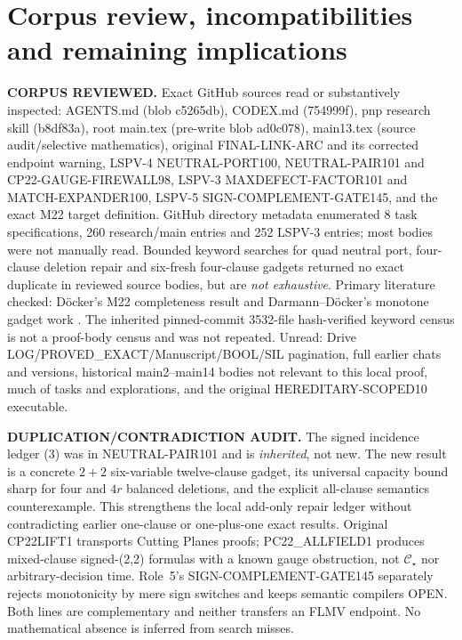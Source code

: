 \documentclass[11pt]{article}
\newcommand{\CS}{\mathcal C_\star}
\begin{document}
\section{Corpus review, incompatibilities and remaining implications}
\noindent\textbf{CORPUS REVIEWED.} Exact GitHub sources read or substantively inspected: AGENTS.md (blob c5265db), CODEX.md (754999f), pnp research skill (b8df83a), root main.tex (pre-write blob ad0c078), main13.tex (source audit/selective mathematics), original FINAL-LINK-ARC and its corrected endpoint warning, LSPV-4 NEUTRAL-PORT100, NEUTRAL-PAIR101 and CP22-GAUGE-FIREWALL98, LSPV-3 MAXDEFECT-FACTOR101 and MATCH-EXPANDER100, LSPV-5 SIGN-COMPLEMENT-GATE145, and the exact M22 target definition. GitHub directory metadata enumerated 8 task specifications, 260 research/main entries and 252 LSPV-3 entries; most bodies were not manually read. Bounded keyword searches for quad neutral port, four-clause deletion repair and six-fresh four-clause gadgets returned no exact duplicate in reviewed source bodies, but are \emph{not exhaustive}. Primary literature checked: D\"ocker's M22 completeness result \cite{docker} and Darmann--D\"ocker's monotone gadget work \cite{darmann}. The inherited pinned-commit 3532-file hash-verified keyword census is not a proof-body census and was not repeated. Unread: Drive LOG/PROVED_EXACT/Manuscript/BOOL/SIL pagination, full earlier chats and versions, historical main2--main14 bodies not relevant to this local proof, much of tasks and explorations, and the original HEREDITARY-SCOPED10 executable.

\noindent\textbf{DUPLICATION/CONTRADICTION AUDIT.} The signed incidence ledger (3) was in NEUTRAL-PAIR101 and is \emph{inherited}, not new. The new result is a concrete \(2+2\) six-variable twelve-clause gadget, its universal capacity bound sharp for four and \(4r\) balanced deletions, and the explicit all-clause semantics counterexample. This strengthens the local add-only repair ledger without contradicting earlier one-clause or one-plus-one exact results. Original CP22LIFT1 transports Cutting Planes proofs; PC22_ALLFIELD1 produces mixed-clause signed-(2,2) formulas with a known gauge obstruction, not \(\CS\) nor arbitrary-decision time. Role~5's SIGN-COMPLEMENT-GATE145 separately rejects monotonicity by mere sign switches and keeps semantic compilers OPEN. Both lines are complementary and neither transfers an FLMV endpoint. No mathematical absence is inferred from search misses.
\end{document}
